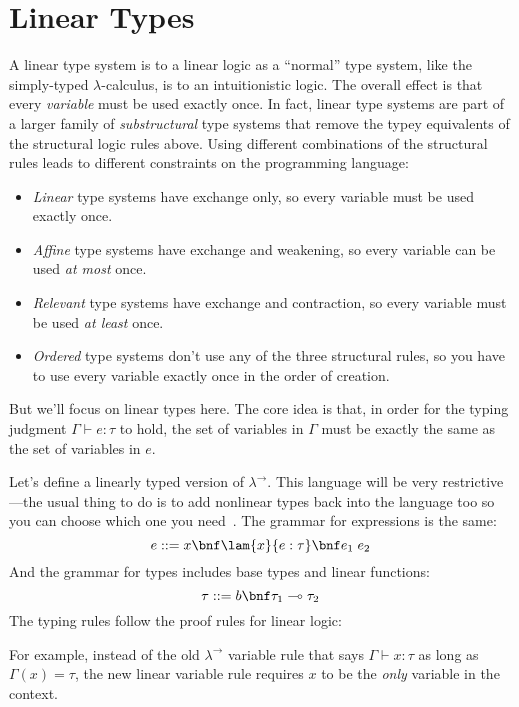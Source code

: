 \section{Linear Types}

A linear type system is to a linear logic as a ``normal'' type system, like
the simply-typed $\lambda$-calculus, is to an intuitionistic logic.
The overall effect is that every \emph{variable} must be used exactly once.
In fact, linear type systems are part of a larger family of
\emph{substructural} type systems that remove the typey equivalents of the
structural logic rules above.
Using different combinations of the structural rules leads to different
constraints on the programming language:
%
\begin{itemize}
\item \emph{Linear} type systems have exchange only, so every variable must be
used exactly once.
\item \emph{Affine} type systems have exchange and weakening, so every
variable can be used \emph{at most} once.
\item \emph{Relevant} type systems have exchange and contraction, so every
variable must be used \emph{at least} once.
\item \emph{Ordered} type systems don't use any of the three structural rules,
so you have to use every variable exactly once in the order of creation.
\end{itemize}
%
But we'll focus on linear types here.
The core idea is that, in order for the typing judgment
$\Gamma \vdash e : \tau$
to hold, the set of variables in $\Gamma$ must be exactly the same as the set
of variables in $e$.

Let's define a linearly typed version of $\lambda^\to$.
This language will be very restrictive---the usual thing to do is to add
nonlinear types back into the language too so you can choose which one you
need~\cite{changetheworld}.
The grammar for expressions is the same:
%
$$e ::= x \bnf
\lam{x}{e : \tau} \bnf
e_1 \; e_2$$
%
And the grammar for types includes base types and linear functions:
%
$$\tau ::= b \bnf
\tau_1 \lolly \tau_2$$
%
The typing rules follow the proof rules for linear logic:
%
%
For example, instead of the old $\lambda^\to$ variable rule that says $\Gamma
\vdash x : \tau$ as long as $\Gamma(x) = \tau$, the new linear variable rule
requires $x$ to be the \emph{only} variable in the context.

